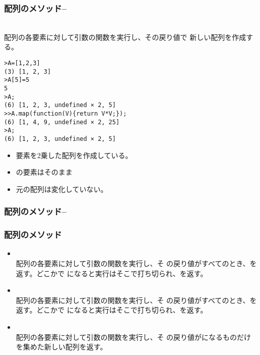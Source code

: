 \begin{frame}[containsverbatim]
 \frametitle{配列のメソッド--}
 \\配列の各要素に対して引数の関数を実行し、その戻り値で
 新しい配列を作成する。
 \begin{Verbatim}[fontsize=\tiny]
>A=[1,2,3]
(3) [1, 2, 3]
>A[5]=5
5
>A;
(6) [1, 2, 3, undefined × 2, 5]
>>A.map(function(V){return V*V;});
(6) [1, 4, 9, undefined × 2, 25]
>A;
(6) [1, 2, 3, undefined × 2, 5]
 \end{Verbatim}
 \begin{itemize}
  \item 要素を2乗した配列を作成している。
  \item {}の要素はそのまま
  \item 元の配列は変化していない。
 \end{itemize}
\end{frame}
\begin{frame}[containsverbatim]
 \frametitle{配列のメソッド--}
\end{frame}
\begin{frame}[containsverbatim]
 \frametitle{配列のメソッド}
\begin{itemize}
 \item {}\\配列の各要素に対して引数の関数を実行し、そ
       の戻り値がすべてのとき、を返す。どこかで
       になると実行はそこで打ち切られ、を返す。
 \item {}\\配列の各要素に対して引数の関数を実行し、そ
       の戻り値がすべてのとき、を返す。どこかで
       になると実行はそこで打ち切られ、を返す。
 \item {}\\配列の各要素に対して引数の関数を実行し、そ
       の戻り値がになるものだけを集めた新しい配列を返す。
\end{itemize} 
\end{frame}

\begin{frame}[containsverbatim]
 \frametitle{}
\end{frame}
